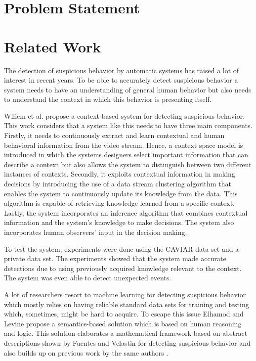 \section{Problem Statement}




\section{Related Work}

The detection of suspicious behavior by automatic systems has raised a lot of interest in recent years. To be able to accurately detect suspicious behavior a system needs to have an understanding of general human behavior but also needs to understand the context in which this behavior is presenting itself.

Wiliem et al. \cite{n1} propose a context-based system for detecting suspicious behavior. This work considers that a system like this needs to have three main components. Firstly, it needs to continuously extract and learn contextual and human behavioral information from the video stream. Hence, a context space model is introduced in which the systems designers select important information that can describe a context but also allows the system to distinguish between two different instances of contexts. Secondly, it exploits contextual information in making decisions by introducing the use of a data stream clustering algorithm that enables the system to continuously update its knowledge from the data. This algorithm is capable of retrieving knowledge learned from a specific context. Lastly, the system incorporates an inference algorithm that combines contextual information and the system's knowledge to make decisions. The system also incorporates human observers' input in the decision making.

To test the system, experiments were done using the CAVIAR data set \cite{n19} and a private data set. The experiments showed that the system made accurate detections due to using previously acquired knowledge relevant to the context. The system was even able to detect unexpected events.

A lot of researchers resort to machine learning for detecting suspicious behavior which mostly relies on having reliable standard data sets for training and testing which, sometimes, might be hard to acquire. To escape this issue Elhamod and Levine \cite{n2} propose a semantics-based solution which is based on human reasoning and logic. This solution elaborates a mathematical framework based on abstract descriptions shown by Fuentes and Velastin \cite{n3} for detecting suspicious behavior and also builds up on previous work by the same authors \cite{n4}.


